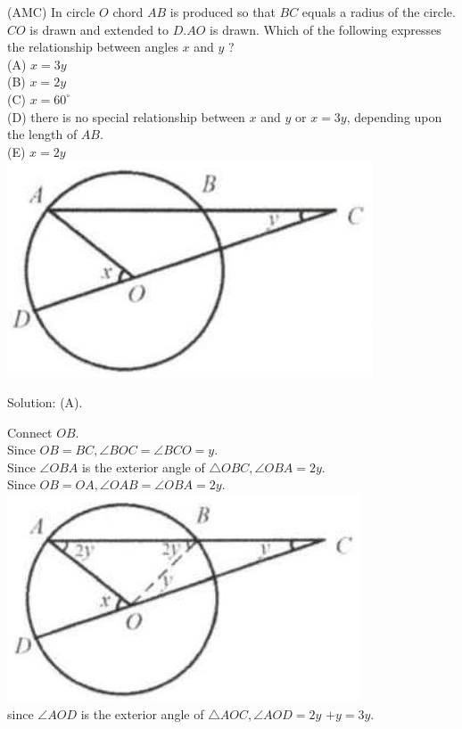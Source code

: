 \documentclass{article}
\begin{document}
(AMC) In circle \(O\) chord \(A B\) is produced so that \(B C\) equals a radius of the circle. \(C O\) is drawn and extended to \(D . A O\) is drawn. Which of the following expresses the relationship between angles \(x\) and \(y\) ?\\
(A) \(x=3 y\)\\
(B) \(x=2 y\)\\
(C) \(x=60^{\circ}\)\\
(D) there is no special relationship between \(x\) and \(y\) or \(x=3 y\), depending upon the length of \(A B\).\\
(E) \(x=2 y\)\\
\centering
\includegraphics[width=\textwidth]{images/150(2).jpg}

Solution: (A).


Connect \(O B\).\\
Since \(O B=B C, \angle B O C=\angle B C O=y\).\\
Since \(\angle O B A\) is the exterior angle of \(\triangle O B C, \angle O B A=2 y\).\\
Since \(O B=O A, \angle O A B=\angle O B A=2 y\).\\
\centering
\includegraphics[width=\textwidth]{images/151(2).jpg}\\
since \(\angle A O D\) is the exterior angle of \(\triangle A O C, \angle A O D=2 y\) \(+y=3 y\).
\end{document}
